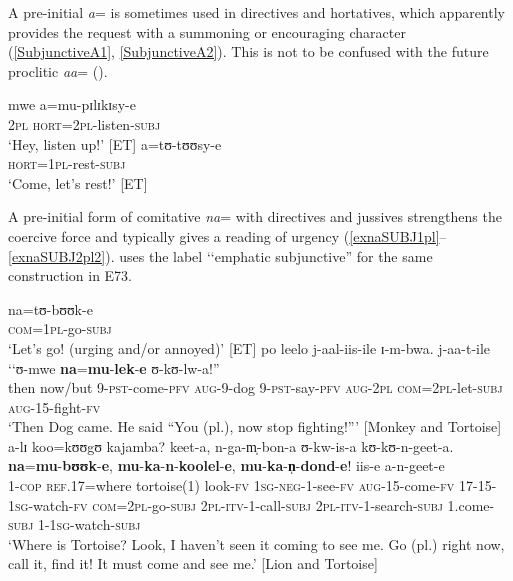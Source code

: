 A pre-initial \textit{a}= is sometimes used in directives and hortatives, which apparently provides the request with a summoning or encouraging character (\ref{SubjunctiveA1}, \ref{SubjunctiveA2}). This is not to be confused with the future proclitic \textit{aa}= ().

\begin{exe}
\ex \label{SubjunctiveA1}\gll mwe a=mu-pɪlɪkɪsy-e\\
\textsc{2pl} \textsc{hort}=\textsc{2pl}-listen-\textsc{subj}\\
\glt \lq Hey, listen up!' [ET]
\ex \label{SubjunctiveA2}\gll a=tʊ-tʊʊsy-e\\
\textsc{hort}=\textsc{1pl}-rest-\textsc{subj}\\
\glt \lq Come, let's rest!' [ET]
\end{exe}

\largerpage
\label{SubjunctiveNa} A pre-initial form of comitative \textit{na}= with directives and jussives strengthens the coercive force and typically gives a reading of urgency (\ref{exnaSUBJ1pl}--\ref{exnaSUBJ2pl2}). \citet[89]{NicolleS2013b} uses the label \lq\lq emphatic subjunctive'' for the same construction in  E73.
\begin{exe}
\ex \label{exnaSUBJ1pl}
\gll na=tʊ-bʊʊk-e\\
\textsc{com}=\textsc{1pl}-go-\textsc{subj}\\
\glt \lq Let's go! (urging and/or annoyed)' [ET]
\ex \label{exnaSUBJ2pl1} \gll po leelo j-aal-iis-ile ɪ-m-bwa. j-aa-t-ile \textup{\lq\lq}ʊ-mwe \textbf{na}=\textbf{mu}-\textbf{lek}-\textbf{e} ʊ-kʊ-lw-a!\textup{''}\\
then now/but 9-\textsc{pst}-come-\textsc{pfv} \textsc{aug}-9-dog 9-\textsc{pst}-say-\textsc{pfv} \phantom{\lq\lq}\textsc{aug}-\textsc{2pl} \textsc{com}=\textsc{2pl}-let-\textsc{subj} \textsc{aug}-15-fight-\textsc{fv}\\\glt `Then Dog came. He said ``You (pl.), now stop fighting!''{}' [Monkey and Tortoise]
\ex \label{exnaSUBJ2pl2}\gll a-lɪ koo=kʊʊgʊ kajamba? keet-a, n-ga-m̩-bon-a ʊ-kw-is-a kʊ-kʊ-n-geet-a. \textbf{na}=\textbf{mu}-\textbf{bʊʊk}-\textbf{e}, \textbf{mu}-\textbf{ka}-\textbf{n}-\textbf{koolel}-\textbf{e}, \textbf{mu}-\textbf{ka}-\textbf{n̩}-\textbf{dond}-\textbf{e}! iis-e a-n-geet-e\\
1-\textsc{cop} \textsc{ref.17}=where tortoise(1) look-\textsc{fv} \textsc{1sg}-\textsc{neg}-1-see-\textsc{fv} \textsc{aug}-15-come-\textsc{fv} 17-15-\textsc{1sg}-watch-\textsc{fv} \textsc{com}=\textsc{2pl}-go-\textsc{subj} \textsc{2pl}-\textsc{itv}-1-call-\textsc{subj} \textsc{2pl}-\textsc{itv}-1-search-\textsc{subj} 1.come-\textsc{subj} 1-\textsc{1sg}-watch-\textsc{subj}\\
\glt `Where is Tortoise?  ‎‎Look, I haven't seen it coming to see me.  ‎‎Go (pl.) right now, call it, find it! It must come and see me.' [Lion and Tortoise]
\end{exe}

